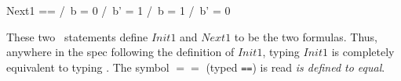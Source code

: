 \begin{en}
\begin{display}
\begin{notla}
Next1 == \/ /\ b = 0
            /\ b' = 1
         \/ /\ b = 1
            /\ b' = 0
\end{notla}
\begin{tlatex}
%
\par\vspace{8.0pt}%
%
%
%
%
%
\end{tlatex}
\end{display}
These two \tlaplus\ statements define $Init1$ and $Next1$ to be the
two formulas.  Thus, anywhere in the spec following the definition of
$Init1$, typing $Init1$ is completely equivalent to typing
.  The symbol $\!==\!$ (typed \verb|==|) is
read \emph{is defined to equal}.
\end{en}

